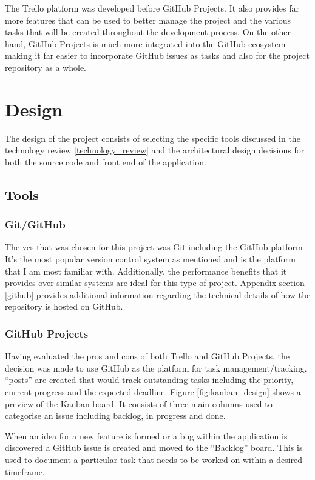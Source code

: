 \documentclass[11pt]{article}
\begin{document}
The Trello platform was developed before GitHub Projects. It also provides far
more features that can be used to better manage the project and the various
tasks that will be created throughout the development process. On the other
hand, GitHub Projects is much more integrated into the GitHub ecosystem making
it far easier to incorporate GitHub issues as tasks and also for the project
repository as a whole.

\clearpage
\section{Design} \label{design} 
The design of the project consists of selecting the specific tools discussed in
the technology review \ref{technology_review} and the architectural design
decisions for both the source code and front end of the application.

\subsection{Tools}
\subsubsection{Git/GitHub} \label{project_management}

The \gls*{vcs} that was chosen for this project was Git including the GitHub
platform \cite{gitvcs}. It's the most popular version control system as
mentioned and is the platform that I am most familiar with. Additionally, the
performance benefits that it provides over similar systems are ideal for this
type of project. Appendix section \ref{github} provides additional information
regarding the technical details of how the repository is hosted on GitHub.

\subsubsection{GitHub Projects}
Having evaluated the pros and cons of both Trello and GitHub Projects, the
decision was made to use GitHub as the platform for task management/tracking.
``posts'' are created that would track outstanding tasks including the priority,
current progress and the expected deadline. Figure \ref{fig:kanban_design} shows
a preview of the Kanban board. It consists of three main columns used to
categorise an issue including backlog, in progress and done.

When an idea for a new feature is formed or a bug within the application is
discovered a GitHub issue is created and moved to the ``Backlog'' board. This is
used to document a particular task that needs to be worked on within a desired
timeframe.
\end{document}
